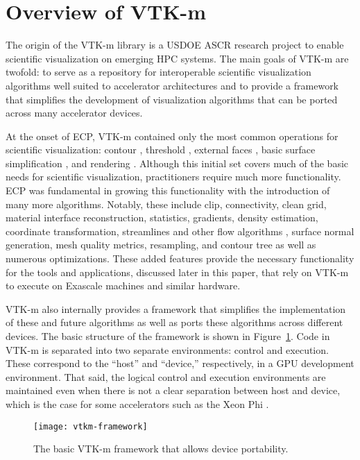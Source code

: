 \section{Overview of VTK-m}

The origin of the VTK-m library \cite{Moreland2016} is a USDOE ASCR research project to enable scientific visualization on emerging HPC systems.
The main goals of VTK-m are twofold: to serve as a repository for interoperable scientific visualization algorithms well suited to accelerator architectures and to provide a framework that simplifies the development of visualization algorithms that can be ported across many accelerator devices.

At the onset of ECP, VTK-m contained only the most common operations for scientific visualization: contour \cite{Lo2012}, threshold \cite{Maynard2013}, external faces \cite{Lessley2016}, basic surface simplification \cite{Moreland2016}, and rendering \cite{Larsen2015:VR,Larsen2015:RayTrace}.
Although this initial set covers much of the basic needs for scientific visualization, practitioners require much more functionality.
ECP was fundamental in growing this functionality with the introduction of many more algorithms.
Notably, these include clip, connectivity, clean grid, material interface reconstruction, statistics, gradients, density estimation, coordinate transformation, streamlines and other flow algorithms \cite{Pugmire2018}, surface normal generation, mesh quality metrics, resampling, and contour tree  as well as numerous optimizations.
These added features provide the necessary functionality for the tools and applications, discussed later in this paper, that rely on VTK-m to execute on Exascale machines and similar hardware.

VTK-m also internally provides a framework that simplifies the implementation of these and future algorithms as well as ports these algorithms across different devices.
The basic structure of the framework is shown in Figure~\ref{fig:vtkm-framework}.
Code in VTK-m is separated into two separate environments: control and execution.
These correspond to the ``host'' and ``device,'' respectively, in a GPU development environment.
That said, the logical control and execution environments are maintained even when there is not a clear separation between host and device, which is the case for some accelerators such as the Xeon Phi .

\begin{figure}[htb]
  \texttt{[image: vtkm-framework]}
  \caption{The basic VTK-m framework that allows device portability.}
  \label{fig:vtkm-framework}
\end{figure}


